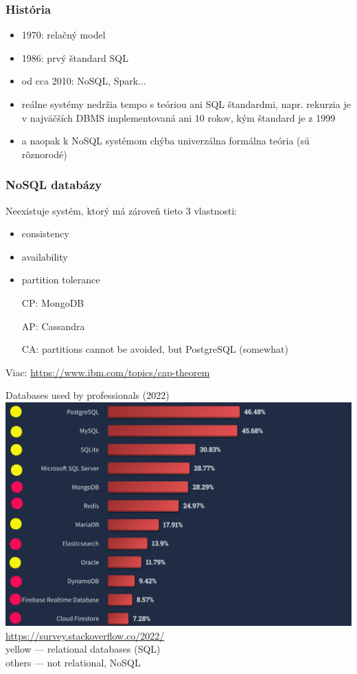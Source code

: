 \documentclass[12pt]{beamer}
\begin{document}
\begin{frame}
\frametitle{História}
\begin{itemize}
\item 1970: relačný model
\item 1986: prvý štandard SQL
\item od cca 2010: NoSQL, Spark...
\pause
\item reálne systémy nedržia tempo s teóriou ani SQL štandardmi, napr. rekurzia je v najväčších DBMS implementovaná ani 10 rokov, kým štandard je z 1999
\item a naopak k NoSQL systémom chýba univerzálna formálna teória (sú rôznorodé)
\end{itemize}
\end{frame}

\begin{frame}
\frametitle{NoSQL databázy}
\begin{theorem}
Neexistuje systém, ktorý má zároveň tieto 3 vlastnosti:
\begin{itemize}
\item consistency
\item availability
\item partition tolerance
\end{itemize}
\end{theorem}
\begin{itemize}
\item[CP:] MongoDB
\item[AP:] Cassandra
\item[CA:] partitions cannot be avoided, but PostgreSQL (somewhat)
\end{itemize}
{\scriptsize Viac: \url{https://www.ibm.com/topics/cap-theorem}}
\end{frame}


\begin{frame}{Databases used by professionals (2022)}
\includegraphics[scale=.15]{commondb_modified.png}\\
{\tiny \url{https://survey.stackoverflow.co/2022/}}\\[3mm]
{\small yellow --- relational databases (SQL)}\\
{\small others --- not relational, NoSQL}
\end{frame}
\end{document}
